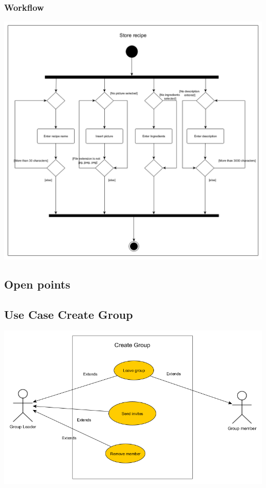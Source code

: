 \documentclass[12pt]{article}
\theoremstyle{definition}
\begin{document}
\subsubsection{Workflow}

\includegraphics[scale=.5]{WorkflowStoreRecipe.png}

\subsection{Open points}


\subsection{Use Case Create Group}

\includegraphics[scale=.5]{UseCaseCreateGroup.png}\\
\end{document}
